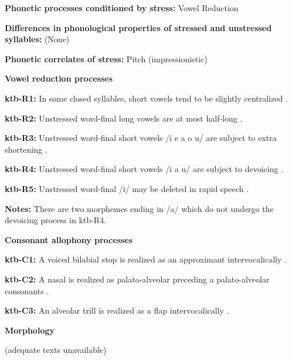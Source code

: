 \textbf{Phonetic processes conditioned by stress:} Vowel Reduction



\textbf{Differences in phonological properties of stressed and unstressed syllables:} (None)



\textbf{Phonetic correlates of stress:} Pitch (impressionistic)



\textbf{Vowel reduction processes}



\textbf{ktb-R1:} In some closed syllables, short vowels tend to be slightly centralized \citep[18]{Treis2008}.



\textbf{ktb-R2:} Unstressed word-final long vowels are at most half-long \citep[19]{Treis2008}.



\textbf{ktb-R3:} Unstressed word-final short vowels /i e a o u/ are subject to extra shortening \citep[20]{Treis2008}.



\textbf{ktb-R4:} Unstressed word-final short vowels /i a u/ are subject to devoicing \citep[20]{Treis2008}.



\textbf{ktb-R5:} Unstressed word-final /i/ may be deleted in rapid speech \citep[20]{Treis2008}.



\textbf{Notes:} There are two morphemes ending in /a/ which do not undergo the devoicing process in ktb-R4.



\textbf{Consonant allophony processes}



\textbf{ktb-C1:} A voiced bilabial stop is realized as an approximant intervocalically \citep[24]{Treis2008}.



\textbf{ktb-C2:} A nasal is realized as palato-alveolar preceding a palato-alveolar consonants \citep[34]{Treis2008}.



\textbf{ktb-C3:} An alveolar trill is realized as a flap intervocalically \citep[35]{Treis2008}.



\textbf{Morphology}



(adequate texts unavailable)



